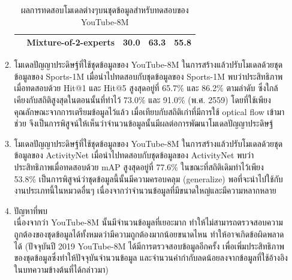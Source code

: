 \begin{enumerate}
\begin{enumerate}
\begin{table}[!ht]
\begin{tabular}{|c|c|c|c|c|}
					& Mixture-of-2-experts & \textbf{30.0} & 63.3 & 55.8\\
					\hline
				\end{tabular}
				\caption{ผลการทดสอบโมเดลต่างๆบนชุดข้อมูลสำหรับทดสอบของ YouTube-8M}
				\label{tab: youtube_youtube}
			\end{table}
			\clearpage
		\item โมเดลปัญญาประดิษฐ์ที่ใช้ชุดข้อมูลของ YouTube-8M ในการสร้างแล้วปรับโมเดลด้วยชุดข้อมูลของ Sports-1M เมื่อนำไปทดสอบกับชุดข้อมูลของ Sports-1M 
		พบว่าประสิทธิภาพเมื่อทดสอบด้วย Hit@1 และ Hit@5 สูงสุดอยู่ที่ 65.7\% และ 86.2\% ตามลำดับ ซึ่งใกล้เคียงกับสถิติสูงสุดในตอนนั้นที่ทำไว้ 73.0\% และ 91.0\% (พ.ศ. 2559) 
		โดยที่ใช้เพียงคุณลักษณะจากการเตรียมข้อมูลไว้แล้ว เมื่อเทียบกับสถิติเก่าที่มีการใช้ optical flow เข้ามาช่วย จึงเป็นการพิสูจน์ให้เห็นว่าจำนวนข้อมูลนั้นมีผลต่อการพัฒนาโมเดลปัญญาประดิษฐ์
			
		\item โมเดลปัญญาประดิษฐ์ที่ใช้ชุดข้อมูลของ YouTube-8M ในการสร้างแล้วปรับโมเดลด้วยชุดข้อมูลของ ActivityNet เมื่อนำไปทดสอบกับชุดข้อมูลของ ActivityNet 
		พบว่าประสิทธิภาพเมื่อทดสอบด้วย mAP สูงสุดอยู่ที่ 77.6\% ในขณะที่สถิติเดิมทำไว้เพียง 53.8\% เป็นการพิสูจน์ว่าชุดข้อมูลนี้นั้นมีความครอบคลุม (generalize) 
		พอที่จะนำไปใช้กับงานประเภทนี้ในหมวดอื่นๆ เนื่องจากว่าจำนวนข้อมูลที่มีขนาดใหญ่และมีความหลากหลาย
		
		\item ปัญหาที่พบ\\
		เนื่องจากว่า YouTube-8M นั้นมีจำนวนข้อมูลที่เยอะมาก ทำให้ไม่สามารถตรวจสอบความถูกต้องของชุดข้อมูลได้ทั้งหมดว่ามีความถูกต้องมากน้อยขนาดไหน 
		ทำให้อาจเกิดข้อผิดพลาดได้ (ปัจจุบันปี 2019 YouTube-8M ได้มีการตรวจสอบข้อมูลอีกครั้ง เพื่อเพิ่มประสิทธิภาพของชุดข้อมูลซึ่งทำให้ปัจจุบันจำนวนข้อมูล 
		และจำนวนคำกำกับลดน้อยลงจากข้อมูลที่ใช้อ้างอิงในบทความข้างต้นที่ได้กล่าวมา)
	\end{enumerate}	
\end{enumerate}
